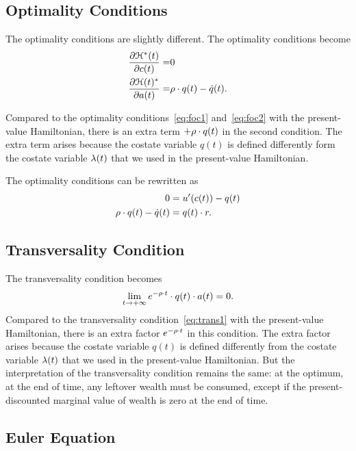 \documentclass[letterpaper,12pt,leqno]{article}
\begin{document}
\subsection{Optimality Conditions}

The optimality conditions are slightly different. The optimality conditions become
\begin{align*}
\frac{\partial \mathcal{H}^{*}(t)}{\partial c(t)}=& 0\\
\frac{\partial \mathcal{H}(t)^{*}}{\partial a(t)}=&\rho\cdot q(t)-\dot{q}(t).
\end{align*}

Compared to the optimality conditions~\eqref{eq:foc1} and~\eqref{eq:foc2} with the present-value Hamiltonian, there is an extra term $+\rho\cdot q(t)$ in the second condition. The extra term arises because the costate variable $q(t)$ is defined differently form the costate variable $\lambda(t)$ that we used in the present-value Hamiltonian. 

The optimality conditions can be rewritten as
\begin{align}
0 &= u'(c(t)) -q(t)\label{eq:auto1}\\
\rho\cdot q(t)-\dot{q}(t)&= q(t)\cdot  r .\label{eq:auto2}
\end{align}

\subsection{Transversality Condition}

The transversality condition becomes
\[\lim_{t\to+\infty}e^{-\rho \cdot t} \cdot  q(t)\cdot a(t)=0.\]
Compared to the transversality condition~\eqref{eq:trans1} with the present-value Hamiltonian, there is an extra factor $e^{-\rho \cdot t}$ in this condition. The extra factor arises because the costate variable $q(t)$ is defined differently from the costate variable $\lambda(t)$ that we used in the present-value Hamiltonian. But the interpretation of the transversality condition remains the same: at the optimum, at the end of time, any leftover wealth must be consumed, except if the present-discounted marginal value of wealth is zero at the end of time.

\subsection{Euler Equation}
\end{document}
